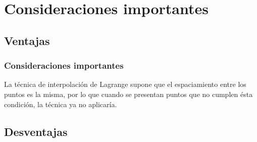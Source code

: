 \documentclass[12pt]{beamer}
\begin{document}

\section{Consideraciones importantes}
\subsection{Ventajas}

\begin{frame}
\frametitle{Consideraciones importantes}
La técnica de interpolación de Lagrange supone que el espaciamiento entre los puntos es la misma, por lo que cuando se presentan puntos que no cumplen ésta condición, la técnica ya no aplicaría.
\end{frame}

\subsection{Desventajas}
\end{document}
